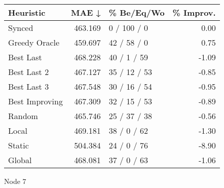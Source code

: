 \begin{tabular}{lrlr}
\toprule
\textbf{Heuristic} & \textbf{MAE ↓} & \textbf{\% Be/Eq/Wo} & \textbf{\% Improv.} \\
\midrule
            Synced &        463.169 &          0 / 100 / 0 &                0.00 \\
     Greedy Oracle &        459.697 &          42 / 58 / 0 &                0.75 \\
         Best Last &        468.228 &          40 / 1 / 59 &               -1.09 \\
       Best Last 2 &        467.127 &         35 / 12 / 53 &               -0.85 \\
       Best Last 3 &        467.548 &         30 / 16 / 54 &               -0.95 \\
    Best Improving &        467.309 &         32 / 15 / 53 &               -0.89 \\
            Random &        465.746 &         25 / 37 / 38 &               -0.56 \\
             Local &        469.181 &          38 / 0 / 62 &               -1.30 \\
            Static &        504.384 &          24 / 0 / 76 &               -8.90 \\
            Global &        468.081 &          37 / 0 / 63 &               -1.06 \\
\bottomrule
\end{tabular}
\caption{Node 7}
\label{tab:non_lr05_le2_bs4_7}
